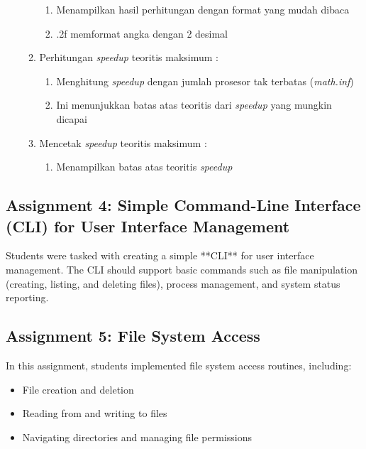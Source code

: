 \documentclass[12pt]{article}
\begin{document}
\begin{enumerate}
\begin{enumerate}
\begin{enumerate}
                \item Menampilkan hasil perhitungan dengan format yang mudah dibaca
                \item .2f memformat angka dengan 2 desimal
            \end{enumerate}
        \item  Perhitungan \textit{speedup} teoritis maksimum :
            \begin{enumerate}
                \item Menghitung \textit{speedup} dengan jumlah prosesor tak terbatas (\textit{math.inf})
                \item Ini menunjukkan batas atas teoritis dari \textit{speedup} yang mungkin dicapai
            \end{enumerate}
        \item Mencetak \textit{speedup} teoritis maksimum :
            \begin{enumerate}
                \item Menampilkan batas atas teoritis \textit{speedup}
            \end{enumerate}


    \end{enumerate}
\end{enumerate}

\subsection{Assignment 4: Simple Command-Line Interface (CLI) for User Interface Management}
Students were tasked with creating a simple **CLI** for user interface management. The CLI should support basic commands such as file manipulation (creating, listing, and deleting files), process management, and system status reporting.

\subsection{Assignment 5: File System Access}
In this assignment, students implemented file system access routines, including:
\begin{itemize}
    \item File creation and deletion
    \item Reading from and writing to files
    \item Navigating directories and managing file permissions
\end{itemize}
\end{document}
